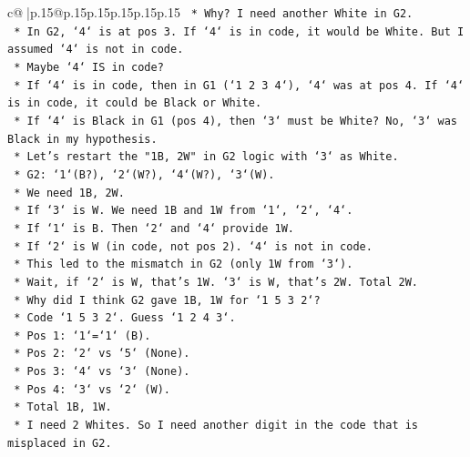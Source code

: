 \documentclass{article}
\begin{document}
{\begin{supertabular}{c@{$\;$}|p{.15\linewidth}@{}p{.15\linewidth}p{.15\linewidth}p{.15\linewidth}p{.15\linewidth}p{.15\linewidth}}
{{{\texttt{                    *   Why? I need another White in G2.} \\
\texttt{                    *   In G2, `4` is at pos 3. If `4` is in code, it would be White. But I assumed `4` is not in code.} \\
\texttt{                    *   Maybe `4` IS in code?} \\
\texttt{                    *   If `4` is in code, then in G1 (`1 2 3 4`), `4` was at pos 4. If `4` is in code, it could be Black or White.} \\
\texttt{                    *   If `4` is Black in G1 (pos 4), then `3` must be White? No, `3` was Black in my hypothesis.} \\
\texttt{                    *   Let's restart the "1B, 2W" in G2 logic with `3` as White.} \\
\texttt{                    *   G2: `1`(B?), `2`(W?), `4`(W?), `3`(W).} \\
\texttt{                    *   We need 1B, 2W.} \\
\texttt{                    *   If `3` is W. We need 1B and 1W from `1`, `2`, `4`.} \\
\texttt{                    *   If `1` is B. Then `2` and `4` provide 1W.} \\
\texttt{                    *   If `2` is W (in code, not pos 2). `4` is not in code.} \\
\texttt{                        *   This led to the mismatch in G2 (only 1W from `3`).} \\
\texttt{                        *   Wait, if `2` is W, that's 1W. `3` is W, that's 2W. Total 2W.} \\
\texttt{                        *   Why did I think G2 gave 1B, 1W for `1 5 3 2`?} \\
\texttt{                        *   Code `1 5 3 2`. Guess `1 2 4 3`.} \\
\texttt{                        *   Pos 1: `1`=`1` (B).} \\
\texttt{                        *   Pos 2: `2` vs `5` (None).} \\
\texttt{                        *   Pos 3: `4` vs `3` (None).} \\
\texttt{                        *   Pos 4: `3` vs `2` (W).} \\
\texttt{                        *   Total 1B, 1W.} \\
\texttt{                        *   I need 2 Whites. So I need another digit in the code that is misplaced in G2.} \\
}}}
\end{supertabular}}
\end{document}
